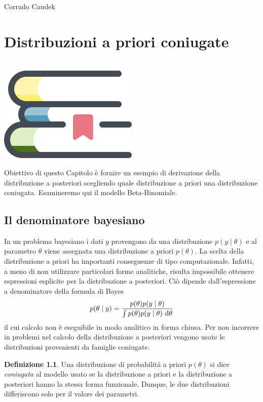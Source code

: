 \documentclass[
  10pt,
  italian,
  a4paper,
  extrafontsizes,onecolumn,openright
  ]{memoir}
\newenvironment{mdframedwithfootChapterintro}
{   
    \savenotes
    \begin{mdframed}[%
    topline=true, bottomline=true, linecolor=oiB, linewidth=1.4pt,
    rightline=false, leftline=false,
    backgroundcolor=oiLB]
    \renewcommand{\thempfootnote}{\arabic{footnote}}
    }
{
    \end{mdframed}
    \spewnotes
}
\newenvironment{chapterintro}{
\vspace{4mm}
\begin{mdframedwithfootChapterintro}
\begin{minipage}[t]{0.10\textwidth}
{$\:$ \\ \setkeys{Gin}{width=2.5em,keepaspectratio}\includegraphics{images/_icons/chapterintro.png}}
\end{minipage}
\hfill
\begin{minipage}[t]{0.90\textwidth}
\setlength{\parskip}{1em}
\large
}{\end{minipage}
\end{mdframedwithfootChapterintro}
\vspace{4mm}
}
\theoremstyle{definition}
\newtheorem{definition}{Definizione}[chapter]
\theoremstyle{definition}
\theoremstyle{definition}
\theoremstyle{definition}
\theoremstyle{remark}
\begin{document}
\bigskip

Corrado Caudek

\mainmatter

\hypertarget{chapter-distr-coniugate}{%
\chapter{Distribuzioni a priori coniugate}\label{chapter-distr-coniugate}}

\begin{chapterintro}
Obiettivo di questo Capitolo è fornire un esempio di derivazione della distribuzione a posteriori scegliendo quale distribuzione a priori una distribuzione coniugata. Esamineremo qui il modello Beta-Binomiale.

\end{chapterintro}

\hypertarget{il-denominatore-bayesiano}{%
\section{Il denominatore bayesiano}\label{il-denominatore-bayesiano}}

In un problema bayesiano i dati \(y\) provengono da una distribuzione \(p(y \mid \theta)\) e al parametro \(\theta\) viene assegnata una distribuzione a priori \(p(\theta)\). La scelta della distribuzione a priori ha importanti conseguenze di tipo computazionale. Infatti, a meno di non utilizzare particolari forme analitiche, risulta impossibile ottenere espressioni esplicite per la distribuzione a posteriori. Ciò dipende dall'espressione a denominatore della formula di Bayes
\begin{equation}
p(\theta \mid y) = \frac{p(\theta) p(y \mid \theta)}{\int p(\theta) p(y \mid \theta) \,\operatorname {d}\! \theta} \notag
\end{equation}
il cui calcolo non è eseguibile in modo analitico in forma chiusa. Per non incorrere in problemi nel calcolo della distribuzione a posteriori vengono usate le distribuzioni provenienti da famiglie coniugate.

\begin{definition}
\protect\hypertarget{def:def-conj-fam}{}{\label{def:def-conj-fam} }Una distribuzione di probabilità a priori \(p(\theta)\) si dice \emph{coniugata} al modello usato se la distribuzione a priori e la distribuzione a posteriori hanno la stessa forma funzionale. Dunque, le due distribuzioni differiscono solo per il valore dei parametri.
\end{definition}
\end{document}

